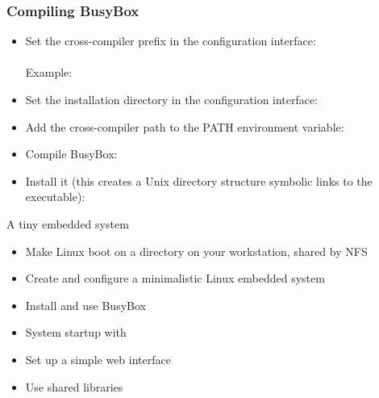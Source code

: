 \begin{frame}
  \frametitle{Compiling BusyBox}
  \begin{itemize}
  \item Set the cross-compiler prefix in the configuration interface: \\
    \\
    Example: 
  \item Set the installation directory in the configuration interface: \\
  \item Add the cross-compiler path to the PATH environment variable:\\
  \item Compile BusyBox:\\
  \item Install it (this creates a Unix directory structure symbolic
    links to the  executable):\\
  \end{itemize}
\end{frame}

\setuplabframe
{A tiny embedded system}
{
  \begin{itemize}
  \item Make Linux boot on a directory on your workstation, shared by NFS
  \item Create and configure a minimalistic Linux embedded system
  \item Install and use BusyBox
  \item System startup with 
  \item Set up a simple web interface
  \item Use shared libraries
  \end{itemize}
}
